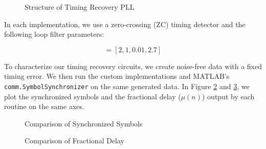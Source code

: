 \documentclass{article}
\begin{document}
\begin{figure}[H]
	\centerline{}
	\caption{Structure of Timing Recovery PLL}
	\label{fig::timing_recovery_block_diagram}
\end{figure}

\noindent In each implementation, we use a zero-crossing (ZC) timing detector and the following loop filter parameters:

\begin{equation*}
	[N, \zeta, B_{loop}, G_D] = [2, 1, 0.01, 2.7]
\end{equation*}

\noindent To characterize our timing recovery circuits, we create noise-free data with a fixed timing error. We then run the custom implementations and MATLAB's \texttt{comm.SymbolSynchronizer} on the same generated data. In Figure \ref{fig::symbol_sync_no_noise} and \ref{fig::fractional_delay_no_noise}, we plot the synchronized symbols and the fractional delay ($\mu(n)$) output by each routine on the same axes.

\begin{figure}[H]
	\centerline{}
	\caption{Comparison of Synchronized Symbols}
	\label{fig::symbol_sync_no_noise}
\end{figure}

\begin{figure}[H]
	\centerline{}
	\caption{Comparison of Fractional Delay}
	\label{fig::fractional_delay_no_noise}
\end{figure}
\end{document}
